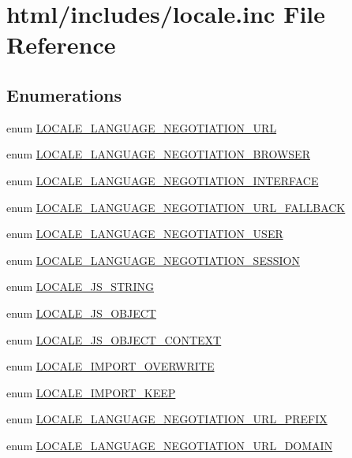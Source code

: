\hypertarget{locale_8inc}{
\section{html/includes/locale.inc File Reference}
\label{locale_8inc}
}
\subsection*{Enumerations}
\begin{DoxyCompactItemize}
\item 
enum \hyperlink{locale_8inc_a47663841cfe2ded810a1af260d33bcef}{LOCALE\_\-LANGUAGE\_\-NEGOTIATION\_\-URL} 
\item 
enum \hyperlink{locale_8inc_a9817fff1ac3baeddca4e604f9e7657c8}{LOCALE\_\-LANGUAGE\_\-NEGOTIATION\_\-BROWSER} 
\item 
enum \hyperlink{locale_8inc_a8e577dfa842e544e736e4e3e5b96ed81}{LOCALE\_\-LANGUAGE\_\-NEGOTIATION\_\-INTERFACE} 
\item 
enum \hyperlink{locale_8inc_ac11524aa19a628190254ea1505ccc87b}{LOCALE\_\-LANGUAGE\_\-NEGOTIATION\_\-URL\_\-FALLBACK} 
\item 
enum \hyperlink{locale_8inc_a00ff3ea0a27d3f09e6d63cc6c2b04abe}{LOCALE\_\-LANGUAGE\_\-NEGOTIATION\_\-USER} 
\item 
enum \hyperlink{locale_8inc_a332fbf28d5c861b2960b5ae1376e6b1e}{LOCALE\_\-LANGUAGE\_\-NEGOTIATION\_\-SESSION} 
\item 
enum \hyperlink{locale_8inc_aff21ba18b5d6e8c731ea7894feb4d29a}{LOCALE\_\-JS\_\-STRING} 
\item 
enum \hyperlink{locale_8inc_ae1afc6234e8a78f1cd6d9731d376ca88}{LOCALE\_\-JS\_\-OBJECT} 
\item 
enum \hyperlink{locale_8inc_ac1107b99261988edb0993dd5aafa7f34}{LOCALE\_\-JS\_\-OBJECT\_\-CONTEXT} 
\item 
enum \hyperlink{locale_8inc_afd5557a8da0f5c5b4f1965609c9488d5}{LOCALE\_\-IMPORT\_\-OVERWRITE} 
\item 
enum \hyperlink{locale_8inc_a303136b14da01d0bdb7088444b3da25e}{LOCALE\_\-IMPORT\_\-KEEP} 
\item 
enum \hyperlink{locale_8inc_a850c602237657f7df487f9d1dfe951df}{LOCALE\_\-LANGUAGE\_\-NEGOTIATION\_\-URL\_\-PREFIX} 
\item 
enum \hyperlink{locale_8inc_ac815dab3f6c2244543e6c87b3c78b722}{LOCALE\_\-LANGUAGE\_\-NEGOTIATION\_\-URL\_\-DOMAIN} 
\end{DoxyCompactItemize}
